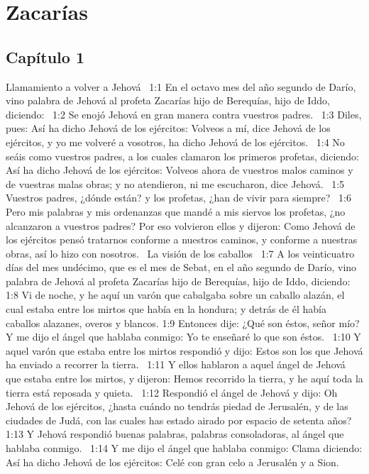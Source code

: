 
\chapter{Zacarías}

\section*{Capítulo 1}
Llamamiento a volver a Jehová  
1:1 En el octavo mes del año segundo de Darío, vino palabra de Jehová al profeta Zacarías hijo de Berequías, hijo de Iddo, diciendo:  
1:2 Se enojó Jehová en gran manera contra vuestros padres.  
1:3 Diles, pues: Así ha dicho Jehová de los ejércitos: Volveos a mí, dice Jehová de los ejércitos, y yo me volveré a vosotros, ha dicho Jehová de los ejércitos.  
1:4 No seáis como vuestros padres, a los cuales clamaron los primeros profetas, diciendo: Así ha dicho Jehová de los ejércitos: Volveos ahora de vuestros malos caminos y de vuestras malas obras; y no atendieron, ni me escucharon, dice Jehová.  
1:5 Vuestros padres, ¿dónde están? y los profetas, ¿han de vivir para siempre?  
1:6 Pero mis palabras y mis ordenanzas que mandé a mis siervos los profetas, ¿no alcanzaron a vuestros padres? Por eso volvieron ellos y dijeron: Como Jehová de los ejércitos pensó tratarnos conforme a nuestros caminos, y conforme a nuestras obras, así lo hizo con nosotros.  
La visión de los caballos  
1:7 A los veinticuatro días del mes undécimo, que es el mes de Sebat, en el año segundo de Darío, vino palabra de Jehová al profeta Zacarías hijo de Berequías, hijo de Iddo, diciendo:  
1:8 Vi de noche, y he aquí un varón que cabalgaba sobre un caballo alazán, el cual estaba entre los mirtos que había en la hondura; y detrás de él había caballos alazanes, overos y blancos. 
1:9 Entonces dije: ¿Qué son éstos, señor mío? Y me dijo el ángel que hablaba conmigo: Yo te enseñaré lo que son éstos.  
1:10 Y aquel varón que estaba entre los mirtos respondió y dijo: Estos son los que Jehová ha enviado a recorrer la tierra.  
1:11 Y ellos hablaron a aquel ángel de Jehová que estaba entre los mirtos, y dijeron: Hemos recorrido la tierra, y he aquí toda la tierra está reposada y quieta.  
1:12 Respondió el ángel de Jehová y dijo: Oh Jehová de los ejércitos, ¿hasta cuándo no tendrás piedad de Jerusalén, y de las ciudades de Judá, con las cuales has estado airado por espacio de setenta años?  
1:13 Y Jehová respondió buenas palabras, palabras consoladoras, al ángel que hablaba conmigo.  
1:14 Y me dijo el ángel que hablaba conmigo: Clama diciendo: Así ha dicho Jehová de los ejércitos: Celé con gran celo a Jerusalén y a Sion.  
